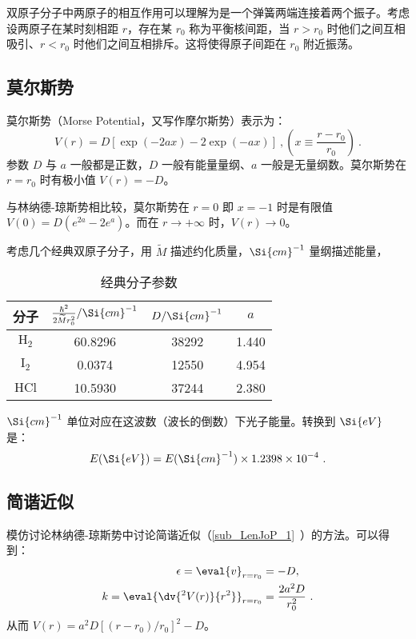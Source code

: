 
双原子分子中两原子的相互作用可以理解为是一个弹簧两端连接着两个振子。考虑设两原子在某时刻相距 $r$，存在某 $r_0$ 称为平衡核间距，当 $r>r_0$ 时他们之间互相吸引、$r<r_0$ 时他们之间互相排斥。这将使得原子间距在 $r_0$ 附近振荡。

\subsection{莫尔斯势}
莫尔斯势（Morse Potential，又写作摩尔斯势）表示为：
\begin{equation}
V(r) = D [\exp(-2ax) - 2\exp(-ax)] \ , \left(x \equiv \frac{r-r_0}{r_0}\right)~.
\end{equation}
参数 $D$ 与 $a$ 一般都是正数，$D$ 一般有能量量纲、$a$ 一般是无量纲数。莫尔斯势在 $r=r_0$ 时有极小值 $V(r)=-D$。

与林纳德-琼斯势相比较，莫尔斯势在 $r = 0$ 即 $x = -1$ 时是有限值 $V(0) = D(e^{2a}-2e^{a})$。而在 $r \rightarrow +\infty$ 时，$V(r) \rightarrow 0$。

考虑几个经典双原子分子，用 $\widetilde{M}$ 描述约化质量，$\Si{cm}^{-1}$ 量纲描述能量，
\begin{table}[ht]
\centering
\caption{经典分子参数}\label{tab_MoPoQM1}
\begin{tabular}{|c|c|c|c|}
\hline
分子 & $\frac{\hbar^2}{2 \widetilde{M} r_0^2}/\Si{cm}^{-1}$ & $D/\Si{cm}^{-1}$ & $a$ \\
\hline
$\text{H}_2$ & 60.8296 & 38292 & 1.440 \\
\hline
$\text{I}_2$ & 0.0374 & 12550 & 4.954 \\
\hline
$\text{HCl}$ & 10.5930 & 37244 & 2.380 \\
\hline
\end{tabular}
\end{table}
$\Si{cm}^{-1}$ 单位对应在这波数（波长的倒数）下光子能量。转换到 $\Si{eV}$ 是：
$$E(\Si{eV}) = E(\Si{cm}^{-1}) \times 1.2398 \times 10^{-4} ~.$$

\subsection{简谐近似}
模仿讨论林纳德-琼斯势中讨论简谐近似（\autoref{sub_LenJoP_1}~）的方法。可以得到：
\begin{equation}
\begin{aligned}
\epsilon = \eval{v}_{r = r_0}& = -D ,\\
k = \eval{\dv{^2 V(r)}{r^2}}_{r = r_0}& = \frac{2a^2 D}{r_0^2} ~.
\end{aligned}
\end{equation}
从而 $V(r) = a^2 D[(r-r_0)/r_0]^2 - D$。

